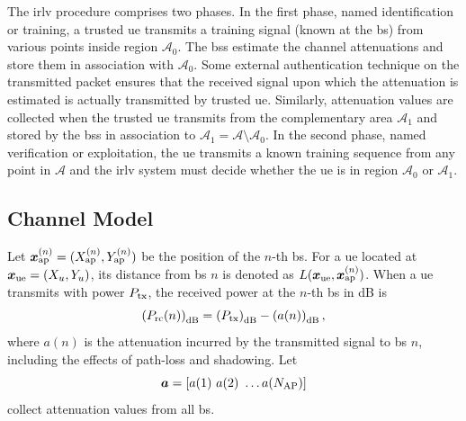 \documentclass[conference,final]{IEEEtran}
\begin{document}
The \ac{irlv} procedure comprises two phases. In the first phase, named identification or training, a trusted \ac{ue} transmits a training signal (known at the \acs{bs}) from various points inside region $\mathcal{A}_0$.  The \acp{bs} estimate the channel attenuations and store them in association with $\mathcal{A}_0$. Some external authentication technique on the transmitted packet  ensures that the received signal upon which the attenuation is estimated is actually transmitted by trusted \ac{ue}. Similarly, attenuation values are collected when the trusted \ac{ue} transmits  from the complementary area $\mathcal{A}_1$ and  stored by the \acp{bs} in association to $\mathcal{A}_1 = \mathcal{A} \setminus \mathcal{A}_0$. In the second  phase, named verification or exploitation, the \ac{ue} transmits a known training sequence from any point in $\mathcal{A}$ and the \ac{irlv} system must decide whether the \ac{ue} is in region $\mathcal{A}_0$ or $\mathcal{A}_1$.


\subsection{Channel Model}

Let $\bm{x}_{\rm ap}^{(n)} =(X_{\rm ap}^{(n)},Y_{\rm ap}^{(n)})$ be the position of the $n$-th \ac{bs}. For a \ac{ue} located at $\bm{x}_{\rm ue}=(X_u,Y_u)$, its distance from \ac{bs} $n$ is denoted as $L(\bm{x}_{\rm ue},\bm{x}_{\rm ap}^{(n)})$. When a \ac{ue} transmits with power $P_{\rm tx}$, the received power at the $n$-th \ac{bs} in dB is
\begin{equation}\label{eq: rec pow}
    \left(P_{\rm rc}{(n)}\right)_{\rm dB}= \left(P_{\rm tx}\right)_{\rm dB} - \left(a{(n)}\right)_{\rm dB},
\end{equation}
where $a{(n)}$ is the attenuation incurred by the transmitted signal to \ac{bs} $n$, including the effects of path-loss and shadowing. Let 
\begin{equation}
\bm a = [a(1) \ a(2) \ \dots a(N_{\rm AP})]
\end{equation} 
collect attenuation values from all \ac{bs}.
\end{document}
